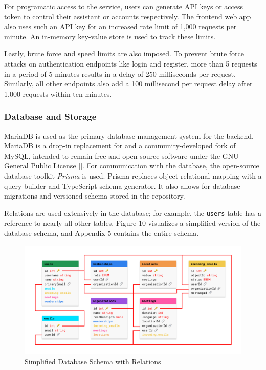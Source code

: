 \documentclass{article}
\begin{document}
For programatic access to the service, users can generate API keys or access token to control their assistant or accounts respectively. The frontend web app also uses such an API key for an increased rate limit of 1,000 requests per minute. An in-memory key-value store is used to track these limits.

Lastly, brute force and speed limits are also imposed. To prevent brute force attacks on authentication endpoints like login and register, more than 5 requests in a period of 5 minutes results in a delay of 250 milliseconds per request. Similarly, all other endpoints also add a 100 millisecond per request delay after 1,000 requests within ten minutes.

\subsubsection{Database and Storage}

MariaDB is used as the primary database management system for the backend. MariaDB is a drop-in replacement for and a community-developed fork of MySQL, intended to remain free and open-source software under the GNU General Public License []. For communication with the database, the open-source database toolkit \emph{Prisma} is used. Prisma replaces object-relational mapping with a query builder and TypeScript schema generator. It also allows for database migrations and versioned schema stored in the repository.

Relations are used extensively in the database; for example, the \texttt{users} table has a reference to nearly all other tables. Figure 10 visualizes a simplified version of the database schema, and Appendix 5 contains the entire schema.

\begin{figure}
	\includegraphics[width=\textwidth]{database-basic.png}
	\caption{Simplified Database Schema with Relations}
\end{figure}
\end{document}
